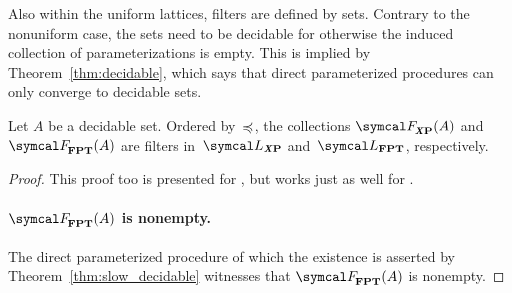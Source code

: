 Also within the uniform lattices, filters are defined by sets.
Contrary to the nonuniform case, the sets need to be decidable for otherwise the induced collection of parameterizations is empty.
This is implied by Theorem~\ref{thm:decidable}, which says that direct parameterized procedures can only converge to decidable sets.
\begin{theorem}
\label{thm:filter}%
  Let $A$ be a decidable set.
  Ordered by~$\preccurlyeq$, the collections $\calF_\clX{P}(A)$ and $\calF_\cl{FPT}(A)$ are filters in~$\calL_\clX{P}$ and~$\calL_\cl{FPT}$, respectively.
\end{theorem}
\begin{proof}
  This proof too is presented for , but works just as well for .

  \paragraph{$\calF_\cl{FPT}(A)$ is nonempty.}
  The direct parameterized procedure of which the existence is asserted by Theorem~\ref{thm:slow_decidable} witnesses that $\calF_\cl{FPT}(A)$ is nonempty.


\end{proof}
